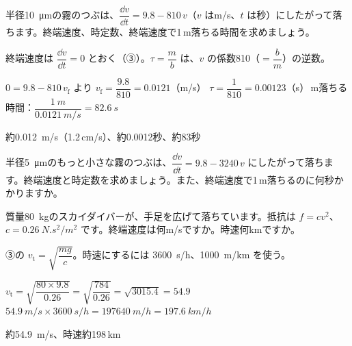 {}


\begin{reidai}[速さに比例する抵抗の終端速度]
半径\qty{10}{\micro m}の霧のつぶは、$\dfrac{\dd v}{\dd t}=9.8-810\,v$（$v$ はm/s、$t$ は秒）にしたがって落ちます。終端速度、時定数、終端速度で1\,m落ちる時間を求めましょう。\par
\kangaekata 終端速度は $\dfrac{\dd v}{\dd t}=0$ とおく（③）。$\tau=\dfrac{m}{b}$ は、$v$ の係数810（$=\dfrac{b}{m}$）の逆数。\par
\shiki $0=9.8-810\,v_{\mathrm f}$ より $v_{\mathrm f}=\dfrac{9.8}{810}=0.0121$（m/s）\bkvifq
$\tau=\dfrac{1}{810}=0.00123$（s）\,m落ちる時間：$\dfrac{\qty{1}{m}}{\qty{0.0121}{m/s}}=\qty{82.6}{s}$\par
\kotae 約\qty{0.012}{m/s}（1.2\,cm/s）、約0.0012秒、約83秒
\end{reidai}

\begin{jibun}
半径\qty{5}{\micro m}のもっと小さな霧のつぶは、$\dfrac{\dd v}{\dd t}=9.8-3240\,v$ にしたがって落ちます。終端速度と時定数を求めましょう。また、終端速度で1\,m落ちるのに何秒かかりますか。
\end{jibun}

\begin{reidai}[2乗に比例する抵抗の終端速度]
質量\qty{80}{kg}のスカイダイバーが、手足を広げて落ちています。抵抗は $f=cv^2$、$c=\qty{0.26}{N.s^2/m^2}$ です。終端速度は何m/sですか。時速何kmですか。\par
\kangaekata ③の $v_{\mathrm t}=\sqrt{\dfrac{mg}{c}}$。時速にするには \qty{3600}{s/h}、\qty{1000}{m/km} を使う。\par
\shiki $v_{\mathrm t}=\sqrt{\dfrac{80\times9.8}{0.26}}=\sqrt{\dfrac{784}{0.26}}=\sqrt{3015.4}=54.9$\bkvifq
$\qty{54.9}{m/s}\times\qty{3600}{s/h}=\qty{197640}{m/h}=\qty{197.6}{km/h}$\par
\kotae 約\qty{54.9}{m/s}、時速約198\,km
\end{reidai}

